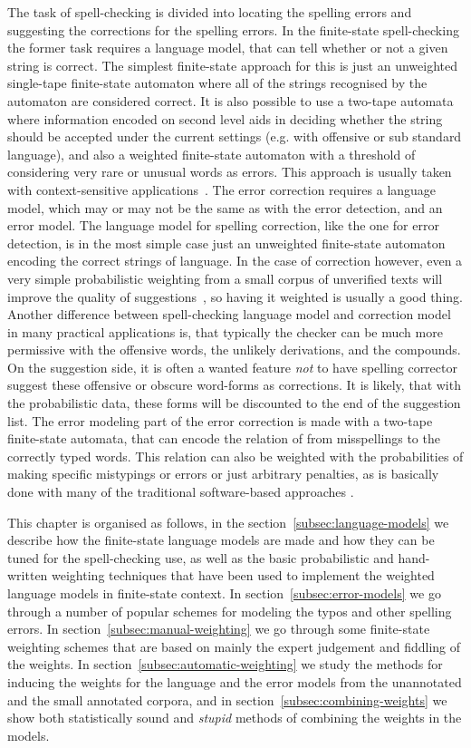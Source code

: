 \documentclass[a4paper,12pt]{article}
\begin{document}
The task of spell-checking is divided into locating the spelling errors and
suggesting the corrections for the spelling errors. In the finite-state
spell-checking the former task requires a language model, that can tell whether
or not a given string is correct. The simplest finite-state approach for this
is just an unweighted single-tape finite-state automaton where all of the
strings recognised by the automaton are considered correct. It is also possible
to use a two-tape automata where information encoded on second level aids in
deciding whether the string should be accepted under the current settings (e.g.
with offensive or sub standard language), and also a weighted finite-state
automaton with a threshold of considering very rare or unusual words as errors.
This approach is usually taken with context-sensitive
applications~\cite[]{otero/2007}. The error correction requires a language
model, which may or may not be the same as with the error detection, and an
error model.  The language model for spelling correction, like the one for
error detection, is in the most simple case just an unweighted finite-state
automaton encoding the correct strings of language. In the case of correction
however, even a very simple probabilistic weighting from a small corpus of
unverified texts will improve the quality of
suggestions~\cite[]{pirinen/2010/lrec}, so having it weighted is usually a good
thing. Another difference between spell-checking language model and correction
model in many practical applications is, that typically the checker can be much
more permissive with the offensive words, the unlikely derivations, and the
compounds. On the suggestion side, it is often a wanted feature \emph{not} to
have spelling corrector suggest these offensive or obscure word-forms as
corrections. It is likely, that with the probabilistic data, these forms will
be discounted to the end of the suggestion list. The error modeling part of the
error correction is made with a two-tape finite-state automata, that can encode
the relation of from misspellings to the correctly typed words. This relation
can also be weighted with the probabilities of making specific mistypings or
errors or just arbitrary penalties, as is basically done with many of the
traditional software-based approaches \cite[such as][]{hunspell/manual}.

This chapter is organised as follows, in the
section~\ref{subsec:language-models} we describe how the finite-state language
models are made and how they can be tuned for the spell-checking use, as well
as the basic probabilistic and hand-written weighting techniques that have been
used to implement the weighted language models in finite-state context. In
section~\ref{subsec:error-models} we go through a number of popular schemes for
modeling the typos and other spelling errors.  In
section~\ref{subsec:manual-weighting} we go through some finite-state weighting
schemes that are based on mainly the expert judgement and fiddling of the
weights.  In section~\ref{subsec:automatic-weighting} we study the methods for
inducing the weights for the language and the error models from the unannotated
and the small annotated corpora, and in section~\ref{subsec:combining-weights}
we show both statistically sound and \emph{stupid} methods of combining the
weights in the models.
\end{document}

